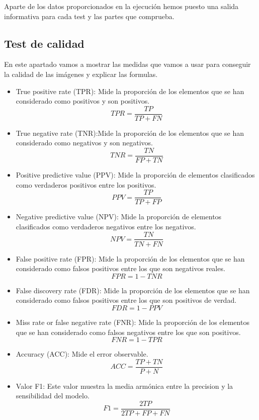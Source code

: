 Aparte de los datos proporcionados en la ejecución hemos puesto una salida informativa para cada test y las partes que comprueba.
 
\subsection{Test de calidad}
En este apartado vamos a mostrar las medidas que vamos a usar para conseguir la calidad de las imágenes y explicar las formulas. 

\begin{itemize}
\item True positive rate (TPR): Mide la proporción de los elementos que se han considerado como positivos y son positivos.
\[TPR=\frac{TP}{TP+FN}\]

\item True negative rate (TNR):Mide la proporción de los elementos que se han considerado como negativos y son negativos. 
\[TNR=\frac{TN}{FP+TN}\]

\item Positive predictive value (PPV): Mide la proporción de elementos clasificados como verdaderos positivos entre los positivos.
\[PPV=\frac{TP}{TP+FP}\]


\item Negative predictive value (NPV): Mide la proporción de elementos clasificados como verdaderos negativos entre los negativos.  
\[NPV=\frac{TN}{TN+FN}\]


\item False positive rate (FPR):
Mide la proporción de los elementos que se han considerado como falsos positivos entre los que son negativos reales.
 \[FPR=1-TNR\]

\item False discovery rate (FDR):
Mide la proporción de los elementos que se han considerado como falsos positivos entre los que son positivos de verdad.
\[FDR=1-PPV\]

\item Miss rate or false negative rate (FNR):
Mide la proporción de los elementos que se han considerado como falsos negativos entre los que son  positivos. \[FNR=1-TPR\]

\item Accuracy (ACC): Mide el error observable.
\[ACC=\frac{TP+TN}{P+N}\]

\item Valor F1: Este valor muestra la media armónica entre la precision y la sensibilidad del modelo.
\[F1=\frac{2TP}{2TP+FP+FN}\]


\end{itemize}
